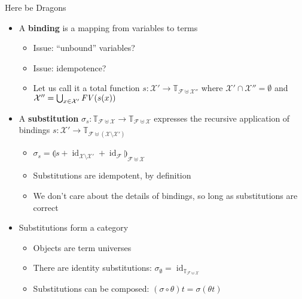 \documentclass[pdf,fyma2]{prosper} %
\newcommand{\opr}[1]{\ensuremath{\operatorname{#1}}}
\newcommand{\var}[1]{\ensuremath{\text{\textrm{\textit{#1}}}}}
\newcommand{\TERMS}[2][]{\ensuremath{\mathbb{T}_{#2}^{#1}}}
\newcommand{\FREEVARS}{\ensuremath{\var{FV}}}
\newcommand{\defn}[1]{\textbf{#1}}
\begin{document}
\begin{slide}{Here be Dragons}
	\begin{itemize}
    \item A \defn{binding} is a mapping from variables to terms
        \begin{itemize}
        \item Issue: ``unbound'' variables?
        \item Issue: idempotence?
        \item Let us call it a total function $s : \mathcal{X'} \to \TERMS{\mathcal{F}\uplus\mathcal{X''}}$ where $\mathcal{X'}\cap\mathcal{X''}=\emptyset$ and $\mathcal{X''} = \bigcup_{x\in \mathcal{X'}} \FREEVARS(s(x))$
        \end{itemize}
    \item A \defn{substitution} $\sigma_s : \TERMS{\mathcal{F}\uplus\mathcal{X}} \to \TERMS{\mathcal{F}\uplus\mathcal{X}}$ expresses the recursive application of bindings $s : \mathcal{X'} \to \TERMS{\mathcal{F}\uplus(\mathcal{X}\setminus\mathcal{X'})}$
        \begin{itemize}
        \item $\sigma_s = {\llparenthesis s + \opr{id}_{\mathcal{X}\setminus\mathcal{X'}} + \opr{id}_\mathcal{F} \rrparenthesis}_{\mathcal{F}\uplus\mathcal{X}}$
        \item Substitutions are idempotent, by definition
        \item We don't care about the details of bindings, so long as substitutions are correct
        \end{itemize}
    \item Substitutions form a category
        \begin{itemize}
        \item Objects are term universes
        \item There are identity substitutions: $\sigma_\emptyset = \opr{id}_{\TERMS{\mathcal{F}\uplus\mathcal{X}}}$
        \item Substitutions can be composed: $(\sigma \circ \theta) t = \sigma (\theta t)$
        \end{itemize}
	\end{itemize}
\end{slide}
\end{document}
